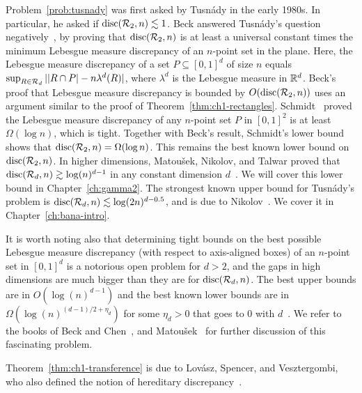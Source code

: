 Problem~\ref{prob:tusnady} was first asked by Tusn\'ady in the early
1980s. In particular, he asked if $\operatorname{disc}(\mathcal{R}_2,n) \lesssim 1$. Beck
answered Tusn\'ady's question negatively~\cite{beck-rect}, by proving that
$\operatorname{disc}(\mathcal{R}_2, n)$ is at least a universal constant times the minimum
Lebesgue measure discrepancy of an $n$-point set in the plane. Here,
the Lebesgue measure discrepancy of a set $P \subseteq [0,1]^d$ of
size $n$ equals $\sup_{R \in \mathcal{R}_d} ||R \cap P| - n\lambda^d(R)|$,
where $\lambda^d$ is the Lebesgue measure in $\mathbb{R}^d$. Beck's proof that Lebesgue measure discrepancy is bounded by  $O(\operatorname{disc}(\mathcal{R}_2,n))$ uses an argument similar to the proof of Theorem~\ref{thm:ch1-rectangles}.
Schmidt~\cite{schmidt-irregVII} proved the Lebesgue measure
discrepancy of any $n$-point set $P$ in $[0,1]^2$ is at least
$\Omega(\log n)$, which is tight. Together with Beck's result, Schmidt's lower bound shows that
$\operatorname{disc}(\mathcal{R}_2,n) = \Omega(\log n)$. This remains the best known lower
bound on $\operatorname{disc}(\mathcal{R}_2,n)$. In higher dimensions, Matou\v{s}ek,
Nikolov, and Talwar proved that $\operatorname{disc}(\mathcal{R}_d,n) \gtrsim \log(n)^{d-1}$
in any constant dimension $d$~\cite{MNT}. We will cover this lower
bound in Chapter~\ref{ch:gamma2}. The strongest known upper bound for Tusn\'ady's
problem is $\operatorname{disc}(\mathcal{R}_d,n) \lesssim \log(2n)^{d-0.5}$, and is due to
Nikolov~\cite{tusnady-ub}. We cover it in Chapter~\ref{ch:bana-intro}.


It is worth noting also that determining tight bounds on the best
possible Lebesgue measure discrepancy (with respect to axis-aligned
boxes) of an $n$-point set in $[0,1]^d$ is a notorious open problem for $d > 2$,
and the gaps in high dimensions are much bigger than they are for $\operatorname{disc}(\mathcal{R}_d,n)$. The
best upper bounds are in $O(\log(n)^{d-1})$ and the best known lower
bounds are in $\Omega(\log(n)^{(d-1)/2 + \eta_d})$ for some
$\eta_d > 0$ that goes to $0$ with $d$~\cite{BilykLV08}. We refer to
the books of Beck and Chen~\cite{BeckChen90}, and
Matou\v{s}ek~\cite{matousek2010geometric} for further discussion of
this fascinating problem.

Theorem~\ref{thm:ch1-transference} is due to
Lov\'asz, Spencer, and Vesztergombi, who also defined the notion of
hereditary discrepancy~\cite{LSV}. 

